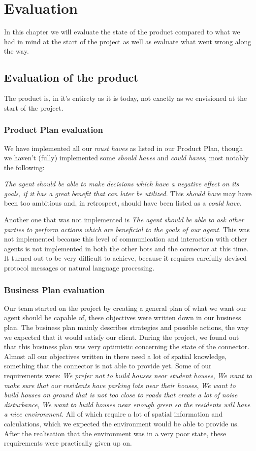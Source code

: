 \chapter{Evaluation}
In this chapter we will evaluate the state of the product compared to what we had in mind at the start of the project as well as evaluate what went wrong along the way.

\section{Evaluation of the product}
The product is, in it's entirety as it is today, not exactly as we envisioned at the start of the project.

\subsection{Product Plan evaluation} We have implemented all our \emph{must haves} as listed in our Product Plan, though we haven't (fully) implemented some \emph{should haves} and \emph{could haves}, most notably the following:

\emph{The agent should be able to make decisions which have a negative effect on its goals, if it has a great benefit that can later be utilized.} This \emph{should have} may have been too ambitious and, in retrospect, should have been listed as a \emph{could have}.

Another one that was not implemented is \emph{The agent should be able to ask other parties to perform actions which are beneficial to the goals of our agent}. This was not implemented because this level of communication and interaction with other agents is not implemented in both the other bots and the connector at this time. It turned out to be very difficult to achieve, because it requires carefully devised protocol messages or natural language processing.

\subsection{Business Plan evaluation} Our team started on the project by creating a general plan of what we want our agent should be capable of, these objectives were written down in our business plan. The business plan mainly describes strategies and possible actions, the way we expected that it would satisfy our client. During the project, we found out that this business plan was very optimistic concerning the state of the connector. Almost all our objectives written in there need a lot of spatial knowledge, something that the connector is not able to provide yet. Some of our requirements were: \emph{We prefer not to build houses near student houses}, \emph{We want to make sure that our residents have parking lots near their houses}, \emph{We want to build houses on ground that is not too close to roads that create a lot of noise disturbance}, \emph{We want to build houses near enough green so the residents will have a nice environment}. All of which require a lot of spatial information and calculations, which we expected the environment would be able to provide us. After the realisation that the environment was in a very poor state, these requirements were practically given up on.

